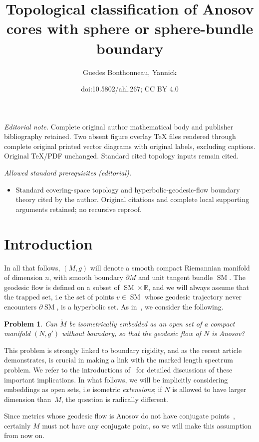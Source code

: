 \documentclass[10pt]{amsart}
\title{Topological classification of Anosov cores with sphere or sphere-bundle boundary}
\author{Guedes Bonthonneau, Yannick}
\date{doi:10.5802/ahl.267; CC BY 4.0}
\theoremstyle{definition}\newtheorem{defi}[theo]{Definition}\newtheorem{rema}[theo]{Remark}\newtheorem{exam}[theo]{Example}\newtheorem{exem}[theo]{Example}\newtheorem{nota}[theo]{Notation}
\newcommand{\R}{\mathbb{R}}
\DeclareMathOperator{\SM}{SM}
\theoremstyle{plain}
\newtheorem{probl}{Problem}
\begin{document}
\maketitle
\noindent\textit{Editorial note.} Complete original author mathematical body and publisher bibliography retained. Two absent figure overlay TeX files rendered through complete original printed vector diagrams with original labels, excluding captions. Original TeX/PDF unchanged. Standard cited topology inputs remain cited.\par\medskip
\noindent\textit{Allowed standard prerequisites (editorial).}\begin{itemize}
\item Standard covering-space topology and hyperbolic-geodesic-flow boundary theory cited by the author. Original citations and complete local supporting arguments retained; no recursive reproof.
\end{itemize}\medskip


\section{Introduction}

In all that follows, $(M,g)$ will denote a smooth compact Riemannian manifold of dimension $n$, with smooth boundary $\partial M$ and unit tangent bundle $\SM$. The geodesic flow is defined on a subset of $\SM \times\R$, and we will always assume that the trapped set, i.e the set of points $v\in \SM$ whose geodesic trajectory never encounters $\partial \SM$, is a hyperbolic set. As in~\cite{Chen-Erchenko-Gogolev}, we consider the following.

\begin{probl}
\label{probA}
Can $\mathring{M}$ be isometrically embedded as an open set of a compact manifold $(N,g')$ without boundary, so that the geodesic flow of $N$ is Anosov?
\end{probl}

This problem is strongly linked to boundary rigidity, and as the recent article~\cite{Erchenko-Lefeuvre} demonstrates, is crucial in making a link with the marked length spectrum problem. We refer to the introductions of~\cite{Chen-Erchenko-Gogolev,Erchenko-Lefeuvre} for detailed discussions of these important implications. In what follows, we will be implicitly considering embeddings as open sets, i.e isometric \emph{extensions}; if $N$ is allowed to have larger dimension than~$M$, the question is radically different.


Since metrics whose geodesic flow is Anosov do not have conjugate points~\cite{Klingenberg-1974}, certainly $M$ must not have any conjugate point, so we will make this assumption from now on.
\end{document}
